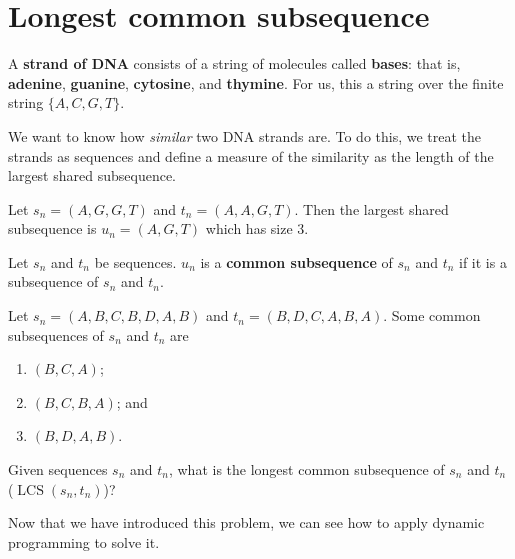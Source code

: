 \section{Longest common subsequence}

\begin{definition}
    A \textbf{strand of DNA} consists of a string of molecules called \textbf{bases}: 
    that is, \textbf{adenine}, \textbf{guanine}, \textbf{cytosine}, and \textbf{thymine}. 
    For us, this a string over the finite string $\{A, C, G, T\}$.
\end{definition}

We want to know how \emph{similar} two DNA strands are. 
To do this, 
we treat the strands as sequences and define a measure of the similarity as the length of the largest shared subsequence.

\begin{example}
    Let $s_n = (A, G, G, T)$ and $t_n = (A, A, G, T)$. 
    Then the largest shared subsequence is $u_n = (A, G, T)$ which has size 3.
\end{example}

\begin{definition}
    Let $s_n$ and $t_n$ be sequences. $u_n$ is a \textbf{common subsequence} 
    of $s_n$ and $t_n$ if it is a subsequence of $s_n$ and $t_n$.
\end{definition}

\begin{example}
    Let $s_n = (A, B, C, B, D, A, B)$ and $t_n = (B, D, C, A, B, A)$. 
    Some common subsequences of $s_n$ and $t_n$ are
    \begin{enumerate}
        \item $(B, C, A)$;
        \item $(B, C, B, A)$; and
        \item $(B, D, A, B)$.
    \end{enumerate}
\end{example}

\begin{problem}
    Given sequences $s_n$ and $t_n$, 
    what is the longest common subsequence of $s_n$ and $t_n$ ($\operatorname{LCS}{(s_n, t_n)}$)?
\end{problem}

Now that we have introduced this problem, 
we can see how to apply dynamic programming to solve it.

